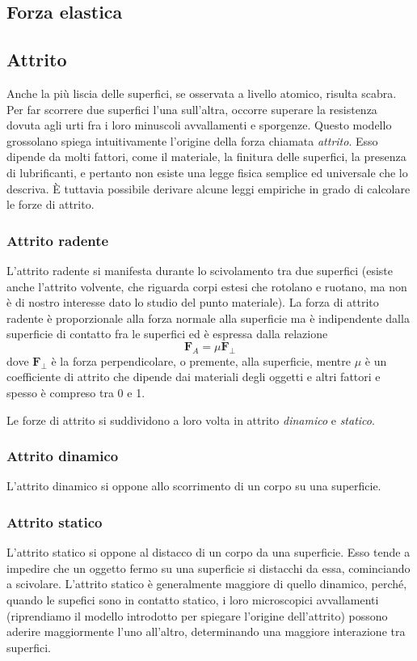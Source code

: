 \subsection{Forza elastica}

\subsection{Attrito}
Anche la più liscia delle superfici, se osservata a livello atomico, risulta
scabra. Per far scorrere due superfici l'una sull'altra, occorre superare la
resistenza dovuta agli urti fra i loro minuscoli avvallamenti e sporgenze. Questo
modello grossolano spiega intuitivamente l'origine della forza chiamata
\textit{attrito}. Esso dipende da molti fattori, come il materiale, la finitura
delle superfici, la presenza di lubrificanti, e pertanto non esiste una legge
fisica semplice ed universale che lo descriva. È tuttavia possibile derivare
alcune leggi empiriche in grado di calcolare le forze di attrito.

\subsubsection*{Attrito radente}
L'attrito radente si manifesta durante lo scivolamento tra due superfici (esiste
anche l'attrito volvente, che riguarda corpi estesi che rotolano e ruotano, ma non
è di nostro interesse dato lo studio del punto materiale). La forza di attrito
radente è proporzionale alla forza normale alla superficie ma è indipendente dalla
superficie di contatto fra le superfici ed è espressa dalla relazione
\[ \textbf{F}_A = \mu\mathbf{F}_\perp \]
dove $\mathbf{F}_\perp$ è la forza perpendicolare, o premente, alla superficie,
mentre $\mu$ è un coefficiente di attrito che dipende dai materiali degli oggetti
e altri fattori e spesso è compreso tra 0 e 1.

Le forze di attrito si suddividono a loro volta in attrito \textit{dinamico} e
\textit{statico}.

\subsubsection*{Attrito dinamico}
L'attrito dinamico si oppone allo scorrimento di un corpo su una superficie.

\subsubsection*{Attrito statico}
L'attrito statico si oppone al distacco di un corpo da una superficie. Esso tende
a impedire che un oggetto fermo su una superficie si distacchi da essa, cominciando
a scivolare. L'attrito statico è generalmente maggiore di quello dinamico, perché,
quando le supefici sono in contatto statico, i loro microscopici avvallamenti
(riprendiamo il modello introdotto per spiegare l'origine dell'attrito)
possono aderire maggiormente l'uno all'altro, determinando una maggiore
interazione tra superfici.

